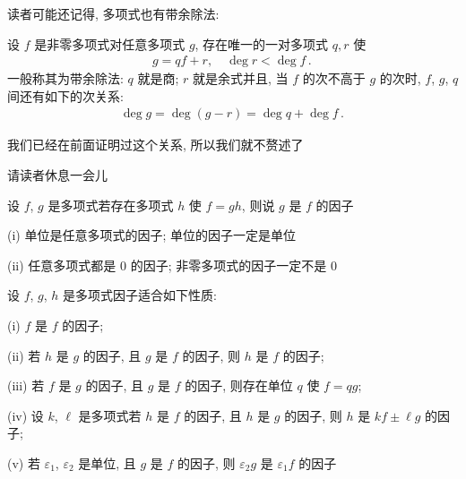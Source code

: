 读者可能还记得, 多项式也有带余除法:

\begin{proposition}
    设 $f$ 是非零多项式\period 对任意多项式 $g$, 存在唯一的一对多项式 $q, r$ 使
    \begin{align*}
        g = q f + r, \quad \deg r < \deg f \period
    \end{align*}
    一般称其为带余除法: $q$ 就是商; $r$ 就是余式\period 并且, 当 $f$ 的次不高于 $g$ 的次时, $f$, $g$, $q$ 间还有如下的次关系:
    \begin{align*}
        \deg g = \deg (g - r) = \deg q + \deg f \period
    \end{align*}
\end{proposition}

我们已经在前面证明过这个关系, 所以我们就不赘述了\period

请读者休息一会儿\period

\myLine

\begin{definition}
    设 $f$, $g$ 是多项式\period 若存在多项式 $h$ 使 $f=gh$, 则说 $g$ 是 $f$ 的因子 \period
\end{definition}

\begin{example}
    (i) 单位是任意多项式的因子; 单位的因子一定是单位\period

    (ii) 任意多项式都是 $0$ 的因子; 非零多项式的因子一定不是 $0$\period
\end{example}

\begin{proposition}
    设 $f$, $g$, $h$ 是多项式\period 因子适合如下性质:

    (i) $f$ 是 $f$ 的因子;

    (ii) 若 $h$ 是 $g$ 的因子, 且 $g$ 是 $f$ 的因子, 则 $h$ 是 $f$ 的因子;

    (iii) 若 $f$ 是 $g$ 的因子, 且 $g$ 是 $f$ 的因子, 则存在单位 $q$ 使 $f = qg$;

    (iv) 设 $k$, $\ell$ 是多项式\period 若 $h$ 是 $f$ 的因子, 且 $h$ 是 $g$ 的因子, 则 $h$ 是 $kf \pm \ell g$ 的因子;

    (v) 若 $\varepsilon_1$, $\varepsilon_2$ 是单位, 且 $g$ 是 $f$ 的因子, 则 $\varepsilon_2 g$ 是 $\varepsilon_1 f$ 的因子\period
\end{proposition}

